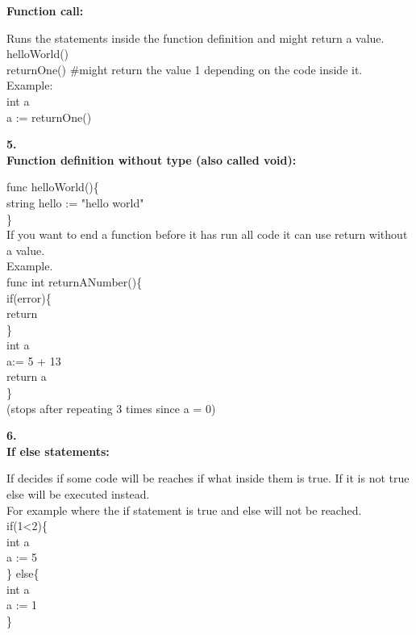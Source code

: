\begin{flushleft}
\textbf{Function call:}
\end{flushleft}
Runs the statements inside the function definition and might return a value.\\
helloWorld()\\
returnOne() \hspace*{15mm} \#might return the value 1 depending on the code inside it.\\
Example:\\
int a\\
a := returnOne()
\begin{flushleft}
\textbf{5.}\\
\textbf{Function definition without type (also called void):}
\end{flushleft}
func helloWorld()\{\\
\hspace*{12mm}string hello := "hello world"\\
\}\\
If you want to end a function before it has run all code it can use return without a value.\\
Example. \\
func int returnANumber()\{\\
\hspace*{13mm} if(error)\{\\
\hspace*{27mm} return\\
\}\\
\hspace*{13mm} int a\\
\hspace*{13mm} a:= 5 + 13\\
\hspace*{13mm} return a\\
\}\\
(stops after repeating 3 times since a = 0)
\begin{flushleft}
\textbf{6.}\\
\textbf{If else statements:}
\end{flushleft}
If decides if some code will be reaches if what inside them is true. If it is not true else will be executed instead.\\
For example where the if statement is true and else will not be reached.\\ 
if(1<2)\{\\
\hspace*{11mm} int a\\
\hspace*{11mm}	a := 5\\
\} else\{\\
\hspace*{11mm} int a\\
\hspace*{11mm} a := 1\\
\}

